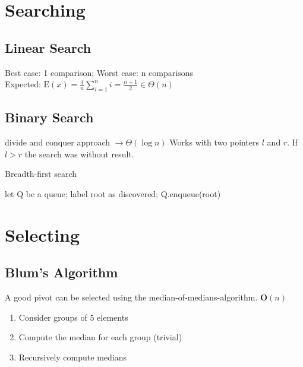 \documentclass[10pt,landscape,a4paper, table]{extarticle}
\begin{document}
\begin{multicols*}{3}
\section{Searching}

\subsection{Linear Search}

Best case: 1 comparison; 
Worst case: n comparisons\\
Expected: $\mathrm{E}(x) = \frac{1}{n}\sum_{i=1}^n i = \frac{n+1}{2} \in \Theta(n)$

\subsection{Binary Search}
divide and conquer approach $\rightarrow \Theta(\log n)$
Works with two pointers $l$ and $r$. If $l > r$ the search was without result.

{\scriptsize
\begin{algorithm}[H]
    \caption{Breadth-first search}
    \label{FWAlgorithm}
    \SetAlgoLined
    let Q be a queue; label root as discovered; Q.enqueue(root)\\
\end{algorithm}}

\section{Selecting}

\subsection{Blum's Algorithm}
A good pivot can be selected using the median-of-medians-algorithm. $\mathbf{O}(n)$

\begin{enumerate}
    \item Consider groups of 5 elements
    \item Compute the median for each group (trivial)
    \item Recursively compute medians
\end{enumerate}


\end{multicols*}
\end{document}
